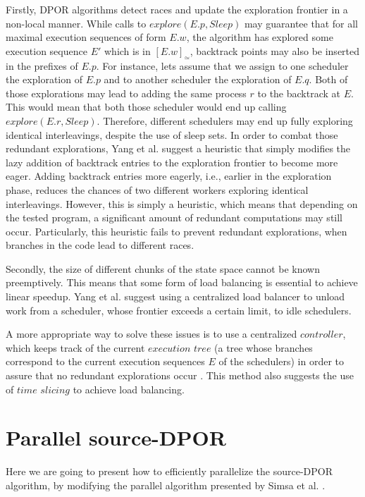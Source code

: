 Firstly, DPOR algorithms detect races and update the exploration frontier in a non-local manner. While calls 
to $explore(E.p, Sleep)$ may guarantee that for all maximal execution 
sequences of form $E.w$, the algorithm has explored some execution sequence $E'$ which is in
$[E.w]_\simeq$, backtrack points may also be inserted in the prefixes of $E.p$. 
For instance, lets assume that we assign to one scheduler the exploration of $E.p$ and to another scheduler
the exploration of $E.q$. Both of those explorations may lead to adding the same process $r$ to the backtrack at $E$. This would mean that
both those scheduler would end up calling $explore(E.r, Sleep)$. Therefore, different schedulers may end up fully exploring
identical interleavings, despite the use of sleep sets. In order to combat those redundant explorations, 
Yang et al. \cite{Yang:2007:DDP:1770532.1770541} suggest a heuristic
that simply modifies the lazy addition of backtrack entries to the exploration frontier \cite{FlanaganDPOR} to become more eager.
Adding backtrack entries more eagerly, i.e., earlier in the exploration phase, reduces the chances of two different workers
exploring identical interleavings. However, this is simply a heuristic, which means that
depending on the tested program, a significant amount of redundant computations
may still occur. Particularly, this heuristic fails to prevent redundant explorations, when branches in the code lead to different races.

Secondly, the size of different chunks of the state space cannot be known preemptively. This means that some form of load balancing
is essential to achieve linear speedup.
Yang et al. \cite{Yang:2007:DDP:1770532.1770541} suggest using a centralized load balancer to unload work from a scheduler, whose
frontier exceeds a certain limit, to idle schedulers.

A more appropriate way to solve these issues is to use a centralized $controller$, which keeps track of the current 
$execution$ $tree$ (a tree whose branches correspond to the current execution sequences $E$ of the schedulers) in order
to assure that no redundant explorations occur \cite{Simsa2012ScalableDP}. This method also suggests the use of
$time$ $slicing$ to achieve load balancing. 

\section{Parallel source-DPOR}

Here we are going to present how to efficiently parallelize the source-DPOR algorithm, by modifying the parallel algorithm 
presented by Simsa et al. \cite{Simsa2012ScalableDP}.

